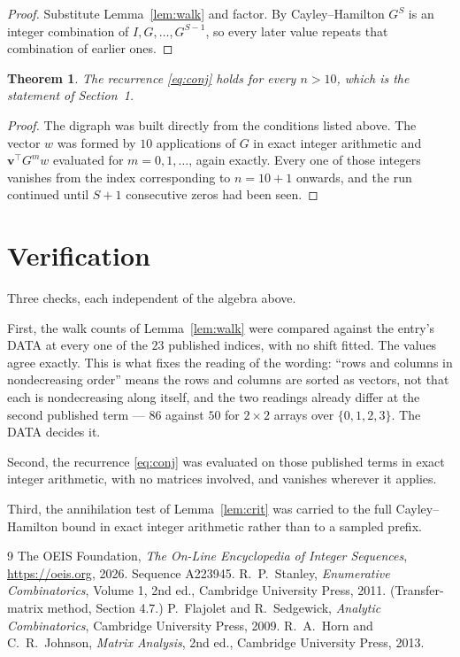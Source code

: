 \documentclass[11pt,a4paper]{article}
\theoremstyle{plain}
\newtheorem{theorem}{Theorem}
\theoremstyle{definition}
\begin{document}
\begin{proof}
Substitute Lemma~\ref{lem:walk} and factor. By Cayley--Hamilton $G^{S}$ is an integer
combination of $I,G,\dots,G^{S-1}$, so every later value repeats that combination of
earlier ones.
\end{proof}

\begin{theorem}
The recurrence \eqref{eq:conj} holds for every $n>10$, which is the statement of
Section~1.
\end{theorem}

\begin{proof}
The digraph was built directly from the conditions listed above. The vector $w$ was formed by
$10$ applications of $G$ in exact integer arithmetic and $\mathbf{v}^{\!\top}G^{m}w$
evaluated for $m=0,1,\dots$, again exactly. Every one of those integers vanishes from the
index corresponding to $n=10+1$ onwards, and the run continued until $S+1$ consecutive
zeros had been seen.
\end{proof}

\section{Verification}

Three checks, each independent of the algebra above.

First, the walk counts of Lemma~\ref{lem:walk} were compared against the entry's DATA at
every one of the $23$ published indices, with no shift fitted. The values agree exactly.
This is what fixes the reading of the wording: ``rows and columns in nondecreasing order''
means the rows and columns are sorted as vectors, not that each is nondecreasing along
itself, and the two readings already differ at the second published term --- $86$ against
$50$ for $2\times2$ arrays over $\{0,1,2,3\}$. The DATA decides it.

Second, the recurrence \eqref{eq:conj} was evaluated on those published terms in exact
integer arithmetic, with no matrices involved, and vanishes wherever it applies.

Third, the annihilation test of Lemma~\ref{lem:crit} was carried to the full
Cayley--Hamilton bound in exact integer arithmetic rather than to a sampled prefix.

\begin{thebibliography}{9}
 The OEIS Foundation, \emph{The On-Line Encyclopedia of Integer
Sequences}, \url{https://oeis.org}, 2026. Sequence A223945.
 R.~P.~Stanley, \emph{Enumerative Combinatorics}, Volume 1, 2nd ed.,
Cambridge University Press, 2011. (Transfer-matrix method, Section 4.7.)
 P.~Flajolet and R.~Sedgewick, \emph{Analytic Combinatorics}, Cambridge
University Press, 2009.
 R.~A.~Horn and C.~R.~Johnson, \emph{Matrix Analysis}, 2nd ed., Cambridge
University Press, 2013.
\end{thebibliography}
\end{document}
